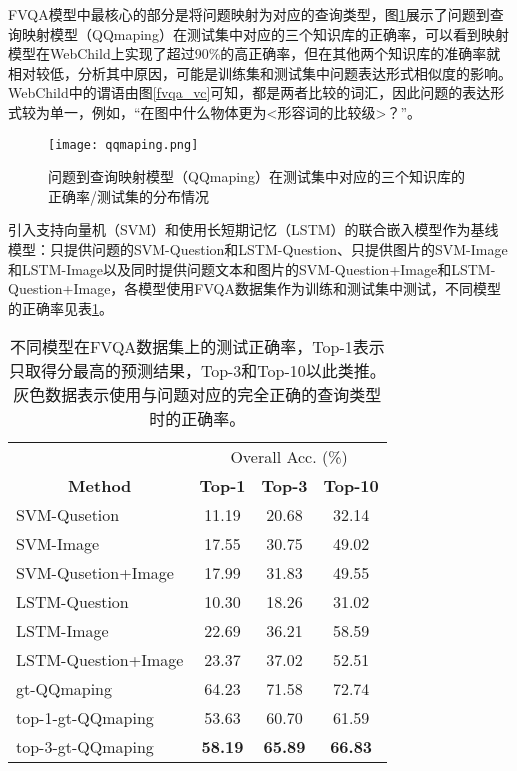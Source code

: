 FVQA模型中最核心的部分是将问题映射为对应的查询类型，图\ref{qqmaping}展示了问题到查询映射模型（QQmaping）在测试集中对应的三个知识库的正确率，可以看到映射模型在WebChild上实现了超过90\%的高正确率，但在其他两个知识库的准确率就相对较低，分析其中原因，可能是训练集和测试集中问题表达形式相似度的影响。WebChild中的谓语由图\ref{fvqa_vc}可知，都是两者比较的词汇，因此问题的表达形式较为单一，例如，“在图中什么物体更为<形容词的比较级>？”。
\begin{figure}[H]
	\centering
	\texttt{[image: qqmaping.png]}
	\caption{问题到查询映射模型（QQmaping）在测试集中对应的三个知识库的正确率/测试集的分布情况}
	\label{qqmaping}
\end{figure}
引入支持向量机（SVM）和使用长短期记忆（LSTM）的联合嵌入模型作为基线模型：只提供问题的SVM-Question和LSTM-Question、只提供图片的SVM-Image和LSTM-Image以及同时提供问题文本和图片的SVM-Question+Image和LSTM-Question+Image，各模型使用FVQA数据集作为训练和测试集中测试，不同模型的正确率见表\ref{fvqa_table}。
\begin{table}[H]
\caption{不同模型在FVQA数据集上的测试正确率，Top-1表示只取得分最高的预测结果，Top-3和Top-10以此类推。灰色数据表示使用与问题对应的完全正确的查询类型时的正确率。}
\begin{tabular}{lccc}
\toprule
\multicolumn{1}{c}{} & \multicolumn{3}{c}{Overall Acc. (\%)}\\
\cmidrule(r){2-4}
\multicolumn{1}{c}{\multirow{-2}{*}{\textbf{Method}}} & \textbf{Top-1}& \textbf{Top-3} & \textbf{Top-10} \\
\midrule
SVM-Qusetion        & 11.19 & 20.68 & 32.14 \\
SVM-Image           & 17.55 & 30.75 & 49.02 \\
SVM-Qusetion+Image  & 17.99 & 31.83 & 49.55 \\
LSTM-Question       & 10.30 & 18.26 & 31.02 \\
LSTM-Image          & 22.69 & 36.21 & 58.59 \\
LSTM-Question+Image & 23.37 & 37.02 & 52.51 \\
\midrule
\cellcolor[HTML]{C0C0C0}gt-QQmaping & \cellcolor[HTML]{C0C0C0}64.23 & \cellcolor[HTML]{C0C0C0}71.58 & \cellcolor[HTML]{C0C0C0}72.74 \\
top-1-gt-QQmaping & 53.63 & 60.70 & 61.59 \\ 
top-3-gt-QQmaping & \textbf{58.19} & \textbf{65.89} & \textbf{66.83} \\
\bottomrule
\end{tabular}
\label{fvqa_table} 
\end{table}

